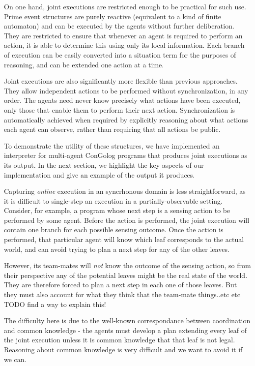 On one hand, joint executions are restricted enough to be practical
for such use. Prime event structures are purely reactive (equivalent
to a kind of finite automaton) and can be executed by the agents without
further deliberation. They are restricted to ensure that whenever
an agent is required to perform an action, it is able to determine
this using only its local information. Each branch of execution can
be easily converted into a situation term for the purposes of reasoning,
and can be extended one action at a time.

Joint executions are also significantly more flexible than previous
approaches. They allow independent actions to be performed without
synchronization, in any order. The agents need never know precisely
what actions have been executed, only those that enable them to perform
their next action. Synchronization is automatically achieved when
required by explicitly reasoning about what actions each agent can
observe, rather than requiring that all actions be public.

To demonstrate the utility of these structures, we have implemented
an interpreter for multi-agent ConGolog programs that produces joint
executions as its output. In the next section, we highlight the key
aspects of our implementation and give an example of the output it
produces.

Capturing \emph{online} execution in an syncrhonous domain is less
straightforward, as it is difficult to single-step an execution in
a partially-observable setting. Consider, for example, a program whose
next step is a sensing action to be performed by some agent. Before
the action is performed, the joint execution will contain one branch
for each possible sensing outcome. Once the action is performed, that
particular agent will know which leaf corresponds to the actual world,
and can avoid trying to plan a next step for any of the other leaves.

However, its team-mates will \emph{not} know the outcome of the sensing
action, so from their perspective any of the potential leaves might
be the real state of the world. They are therefore forced to plan
a next step in each one of those leaves. But they must also account
for what they think that the team-mate things..etc etc TODO find a
way to explain this!

The difficulty here is due to the well-known correspondance between
coordination and common knowledge - the agents must develop a plan
extending every leaf of the joint execution unless it is common knowledge
that that leaf is not legal. Reasoning about common knowledge is very
difficult and we want to avoid it if we can.


